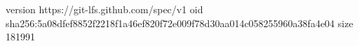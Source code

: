 version https://git-lfs.github.com/spec/v1
oid sha256:5a08dfef8852f2218f1a46ef820f72e009f78d30aa014c058255960a38fa4e04
size 181991
